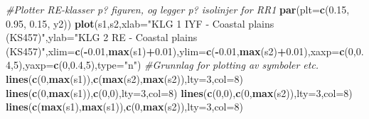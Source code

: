 \documentclass[]{article}
\newenvironment{Shaded}{\begin{snugshade}}{\end{snugshade}}
\newcommand{\CommentTok}[1]{\textcolor[rgb]{0.56,0.35,0.01}{\textit{#1}}}
\newcommand{\DataTypeTok}[1]{\textcolor[rgb]{0.13,0.29,0.53}{#1}}
\newcommand{\DecValTok}[1]{\textcolor[rgb]{0.00,0.00,0.81}{#1}}
\newcommand{\FloatTok}[1]{\textcolor[rgb]{0.00,0.00,0.81}{#1}}
\newcommand{\KeywordTok}[1]{\textcolor[rgb]{0.13,0.29,0.53}{\textbf{#1}}}
\newcommand{\NormalTok}[1]{#1}
\newcommand{\OperatorTok}[1]{\textcolor[rgb]{0.81,0.36,0.00}{\textbf{#1}}}
\newcommand{\StringTok}[1]{\textcolor[rgb]{0.31,0.60,0.02}{#1}}
\begin{document}
\begin{Shaded}
\begin{Highlighting}[]
\CommentTok{#Plotter RE-klasser p? figuren, og legger p? isolinjer for RR1}
\KeywordTok{par}\NormalTok{(}\DataTypeTok{plt=}\KeywordTok{c}\NormalTok{(}\FloatTok{0.15}\NormalTok{, }\FloatTok{0.95}\NormalTok{, }\FloatTok{0.15}\NormalTok{, y2))}
\KeywordTok{plot}\NormalTok{(s1,s2,}\DataTypeTok{xlab=}\StringTok{"KLG 1 IYF - Coastal plains (KS457)"}\NormalTok{,}\DataTypeTok{ylab=}\StringTok{"KLG 2 RE - Coastal plains (KS457)"}\NormalTok{,}\DataTypeTok{xlim=}\KeywordTok{c}\NormalTok{(}\OperatorTok{-}\FloatTok{0.01}\NormalTok{,}\KeywordTok{max}\NormalTok{(s1)}\OperatorTok{+}\FloatTok{0.01}\NormalTok{),}\DataTypeTok{ylim=}\KeywordTok{c}\NormalTok{(}\OperatorTok{-}\FloatTok{0.01}\NormalTok{,}\KeywordTok{max}\NormalTok{(s2)}\OperatorTok{+}\FloatTok{0.01}\NormalTok{),}\DataTypeTok{xaxp=}\KeywordTok{c}\NormalTok{(}\DecValTok{0}\NormalTok{,}\FloatTok{0.4}\NormalTok{,}\DecValTok{5}\NormalTok{),}\DataTypeTok{yaxp=}\KeywordTok{c}\NormalTok{(}\DecValTok{0}\NormalTok{,}\FloatTok{0.4}\NormalTok{,}\DecValTok{5}\NormalTok{),}\DataTypeTok{type=}\StringTok{"n"}\NormalTok{) }\CommentTok{#Grunnlag for plotting av symboler etc.}
\KeywordTok{lines}\NormalTok{(}\KeywordTok{c}\NormalTok{(}\DecValTok{0}\NormalTok{,}\KeywordTok{max}\NormalTok{(s1)),}\KeywordTok{c}\NormalTok{(}\KeywordTok{max}\NormalTok{(s2),}\KeywordTok{max}\NormalTok{(s2)),}\DataTypeTok{lty=}\DecValTok{3}\NormalTok{,}\DataTypeTok{col=}\DecValTok{8}\NormalTok{)}
\KeywordTok{lines}\NormalTok{(}\KeywordTok{c}\NormalTok{(}\DecValTok{0}\NormalTok{,}\KeywordTok{max}\NormalTok{(s1)),}\KeywordTok{c}\NormalTok{(}\DecValTok{0}\NormalTok{,}\DecValTok{0}\NormalTok{),}\DataTypeTok{lty=}\DecValTok{3}\NormalTok{,}\DataTypeTok{col=}\DecValTok{8}\NormalTok{)}
\KeywordTok{lines}\NormalTok{(}\KeywordTok{c}\NormalTok{(}\DecValTok{0}\NormalTok{,}\DecValTok{0}\NormalTok{),}\KeywordTok{c}\NormalTok{(}\DecValTok{0}\NormalTok{,}\KeywordTok{max}\NormalTok{(s2)),}\DataTypeTok{lty=}\DecValTok{3}\NormalTok{,}\DataTypeTok{col=}\DecValTok{8}\NormalTok{)}
\KeywordTok{lines}\NormalTok{(}\KeywordTok{c}\NormalTok{(}\KeywordTok{max}\NormalTok{(s1),}\KeywordTok{max}\NormalTok{(s1)),}\KeywordTok{c}\NormalTok{(}\DecValTok{0}\NormalTok{,}\KeywordTok{max}\NormalTok{(s2)),}\DataTypeTok{lty=}\DecValTok{3}\NormalTok{,}\DataTypeTok{col=}\DecValTok{8}\NormalTok{)}


\end{Highlighting}
\end{Shaded}
\end{document}
